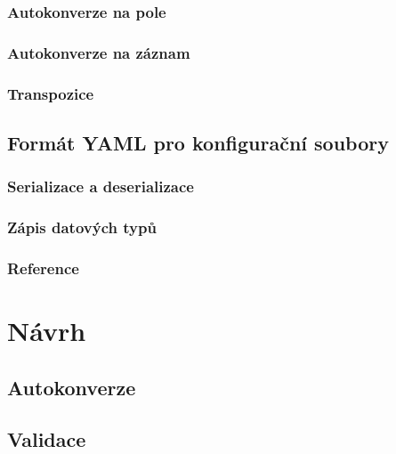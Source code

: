 \documentclass[FM,bw,DP]{tulthesis}
\begin{document}
\subsection{Autokonverze na pole}

\subsection{Autokonverze na záznam}
\label{sec:autokonverze-zaznam}

\subsection{Transpozice}


\section{Formát YAML pro konfigurační soubory}

\subsection{Serializace a deserializace}


\subsection{Zápis datových typů}


\subsection{Reference}


\chapter{Návrh}


\section{Autokonverze}

\section{Validace}
\end{document}
